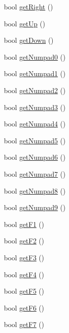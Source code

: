 \begin{DoxyCompactItemize}
\item 
bool \hyperlink{class_update_data_a3b804ea9b4fff968cc58edc80fe19822}{get\-Right} ()
\item 
bool \hyperlink{class_update_data_a3f429c27697b52944a1e6cb67e229c79}{get\-Up} ()
\item 
bool \hyperlink{class_update_data_a18e63ba0c088dce6e42a1530cba0866c}{get\-Down} ()
\item 
bool \hyperlink{class_update_data_adde2ea0adf41dd5244cbf5fc6baa02e0}{get\-Numpad0} ()
\item 
bool \hyperlink{class_update_data_a6d2bedd924d8c6ee102a87208b525560}{get\-Numpad1} ()
\item 
bool \hyperlink{class_update_data_aa3cfec23376b6616ee9c7bce014c0ced}{get\-Numpad2} ()
\item 
bool \hyperlink{class_update_data_af357ea18de13653058336b6087a34742}{get\-Numpad3} ()
\item 
bool \hyperlink{class_update_data_acd419da25bac466ac676fc474de4069f}{get\-Numpad4} ()
\item 
bool \hyperlink{class_update_data_aee25b3ad9c6ff0871b96c61eea8f34ab}{get\-Numpad5} ()
\item 
bool \hyperlink{class_update_data_a8027eda0b719ce336d5a93d679a88cb7}{get\-Numpad6} ()
\item 
bool \hyperlink{class_update_data_ae27d817ed25fc19a2c132fed35aa7f4e}{get\-Numpad7} ()
\item 
bool \hyperlink{class_update_data_ad629272a0be7fc9281915d887a2b2a3e}{get\-Numpad8} ()
\item 
bool \hyperlink{class_update_data_a2da627e8eb4d11d90faa8dfcca372725}{get\-Numpad9} ()
\item 
bool \hyperlink{class_update_data_a468dc7fa0b12d41d4cda9708bc591b4c}{get\-F1} ()
\item 
bool \hyperlink{class_update_data_adf04da55d7068aa73932b92e87cefe14}{get\-F2} ()
\item 
bool \hyperlink{class_update_data_a23baa206949f21c3a92f2b0374d84d45}{get\-F3} ()
\item 
bool \hyperlink{class_update_data_a063f193eed70bbae3fde409ffdba3c2c}{get\-F4} ()
\item 
bool \hyperlink{class_update_data_acf3d0efa012d835b48f2c8c4fdd58236}{get\-F5} ()
\item 
bool \hyperlink{class_update_data_a850a0cb09e6791935fa599a098a40da3}{get\-F6} ()
\item 
bool \hyperlink{class_update_data_ae788e38de8821894a47f919b977e7e99}{get\-F7} ()

\end{DoxyCompactItemize}
